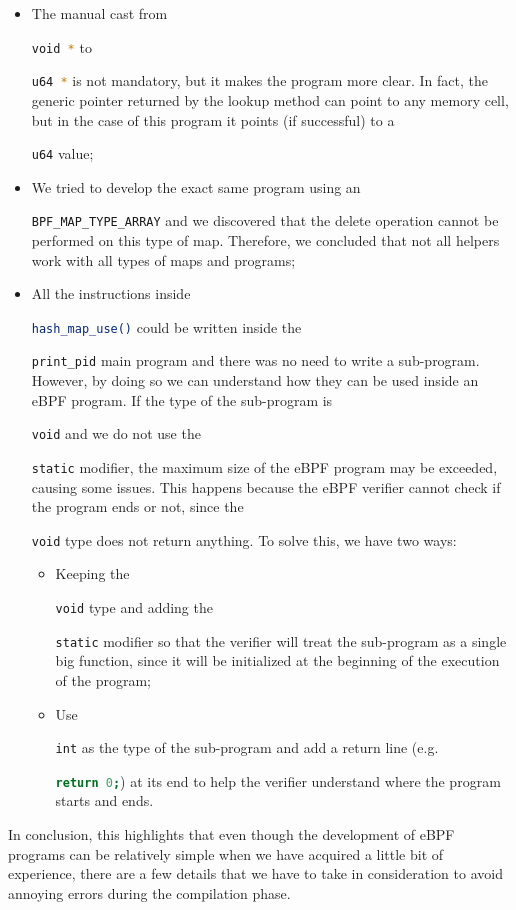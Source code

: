 \begin{itemize}
	\item 
		The manual cast from \raggedright\colorbox{backcolour}{\lstinline[style=commandline, language=bash]|void *|} to \raggedright\colorbox{backcolour}{\lstinline[style=commandline, language=bash]|u64 *|} is not mandatory, but it makes the program more clear.
		In fact, the generic pointer returned by the lookup method can point to any memory cell, but in the case of this program it points (if successful) to a \raggedright\colorbox{backcolour}{\lstinline[style=commandline, language=bash]|u64|} value;
	\item 
		We tried to develop the exact same program using an \raggedright\colorbox{backcolour}{\lstinline[style=commandline, language=bash]|BPF_MAP_TYPE_ARRAY|} and we discovered that the delete operation cannot be performed on this type of map.
		Therefore, we concluded that not all helpers work with all types of maps and programs;
	\item 
		All the instructions inside \raggedright\colorbox{backcolour}{\lstinline[style=commandline, language=bash]|hash_map_use()|} could be written inside the \raggedright\colorbox{backcolour}{\lstinline[style=commandline, language=bash]|print_pid|} main program and there was no need to write a sub-program.
		However, by doing so we can understand how they can be used inside an eBPF program.
		If the type of the sub-program is \raggedright\colorbox{backcolour}{\lstinline[style=commandline, language=bash]|void|} and we do not use the \raggedright\colorbox{backcolour}{\lstinline[style=commandline, language=bash]|static|} modifier, the maximum size of the eBPF program may be exceeded, causing some issues.
		This happens because the eBPF verifier cannot check if the program ends or not, since the \raggedright\colorbox{backcolour}{\lstinline[style=commandline, language=bash]|void|} type does not return anything.
		To solve this, we have two ways:
		\begin{itemize}
			\item 
				Keeping the \raggedright\colorbox{backcolour}{\lstinline[style=commandline, language=bash]|void|} type and adding the \raggedright\colorbox{backcolour}{\lstinline[style=commandline, language=bash]|static|} modifier so that the verifier will treat the sub-program as a single big function, since it will be initialized at the beginning of the execution of the program;
			\item 
				Use \raggedright\colorbox{backcolour}{\lstinline[style=commandline, language=bash]|int|} as the type of the sub-program and add a return line (e.g. \raggedright\colorbox{backcolour}{\lstinline[style=commandline, language=bash]|return 0;|}) at its end to help the verifier understand where the program starts and ends.
		\end{itemize}
\end{itemize}

In conclusion, this highlights that even though the development of eBPF programs can be relatively simple when we have acquired a little bit of experience, there are a few details that we have to take in consideration to avoid annoying errors during the compilation phase.